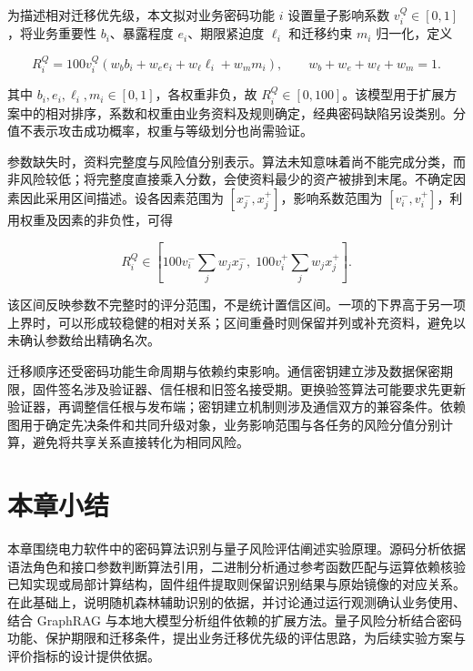 
为描述相对迁移优先级，本文拟对业务密码功能 $i$ 设置量子影响系数 $v_i^Q\in[0,1]$，将业务重要性 $b_i$、暴露程度 $e_i$、期限紧迫度 $\ell_i$ 和迁移约束 $m_i$ 归一化，定义

\begin{equation}
  R_i^Q=100v_i^Q(w_b b_i+w_e e_i+w_\ell\ell_i+w_m m_i),
  \qquad w_b+w_e+w_\ell+w_m=1.
  \label{eq:power-quantum-priority}
\end{equation}

其中 $b_i,e_i,\ell_i,m_i\in[0,1]$，各权重非负，故 $R_i^Q\in[0,100]$。该模型用于扩展方案中的相对排序，系数和权重由业务资料及规则确定，经典密码缺陷另设类别。分值不表示攻击成功概率，权重与等级划分也尚需验证。

参数缺失时，资料完整度与风险值分别表示。算法未知意味着尚不能完成分类，而非风险较低；将完整度直接乘入分数，会使资料最少的资产被排到末尾。不确定因素因此采用区间描述。设各因素范围为 $[x_j^-,x_j^+]$，影响系数范围为 $[v_i^-,v_i^+]$，利用权重及因素的非负性，可得

\begin{equation}
  R_i^Q\in\left[
    100v_i^-\sum_j w_jx_j^-,\;
    100v_i^+\sum_j w_jx_j^+
  \right].
  \label{eq:risk-uncertainty-interval}
\end{equation}

该区间反映参数不完整时的评分范围，不是统计置信区间。一项的下界高于另一项上界时，可以形成较稳健的相对关系；区间重叠时则保留并列或补充资料，避免以未确认参数给出精确名次。

迁移顺序还受密码功能生命周期与依赖约束影响。通信密钥建立涉及数据保密期限，固件签名涉及验证器、信任根和旧签名接受期。更换验签算法可能要求先更新验证器，再调整信任根与发布端；密钥建立机制则涉及通信双方的兼容条件。依赖图用于确定先决条件和共同升级对象，业务影响范围与各任务的风险分值分别计算，避免将共享关系直接转化为相同风险。

\section{本章小结}

本章围绕电力软件中的密码算法识别与量子风险评估阐述实验原理。源码分析依据语法角色和接口参数判断算法引用，二进制分析通过参考函数匹配与运算依赖核验已知实现或局部计算结构，固件组件提取则保留识别结果与原始镜像的对应关系。在此基础上，说明随机森林辅助识别的依据，并讨论通过运行观测确认业务使用、结合 GraphRAG 与本地大模型分析组件依赖的扩展方法。量子风险分析结合密码功能、保护期限和迁移条件，提出业务迁移优先级的评估思路，为后续实验方案与评价指标的设计提供依据。
